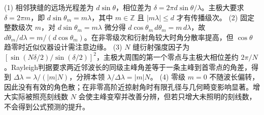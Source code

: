 (1) 相邻狭缝的远场光程差为 \(d\sin\theta\)，相位差为 \(\delta=2\pi d\sin\theta/\lambda\)。主极大要求 \(\delta=2\pi m\)，即 \(d\sin\theta_m=m\lambda\)，其中 \(m\in\mathbb Z\) 且 \(|m\lambda|\le d\) 才有传播级次。
(2) 固定整数级次 \(m\)，对 \(d\sin\theta_m=m\lambda\) 微分得 \(d\cos\theta_m\,d\theta_m=m\,d\lambda\)，故 \(d\theta_m/d\lambda=m/(d\cos\theta_m)\)。在非零级次和衍射角较大时角分散率提高，但 \(\cos\theta\) 趋零时近似仪器设计需注意边缘。
(3) \(N\) 缝衍射强度因子为 \([\sin(N\delta/2)/\sin(\delta/2)]^2\)，主极大周围的第一个零点与主极大相位差约 \(2\pi/N\)。Rayleigh判据要求两近邻波长的同级主峰角差等于一条主峰到首零点的角差，得到 \(\Delta\lambda=\lambda/(|m|N)\)，分辨本领 \(\lambda/\Delta\lambda=|m|N\)。
(4) 零级 \(m=0\) 不随波长偏转，因此没有有效的角色散；在非零高阶近掠射角时有限孔径与几何畸变影响显著。增大实际被照亮刻线数 \(N\) 会使主峰变窄并改善分辨，但若只增大未照明的刻线数，不会得到公式预测的提升。
